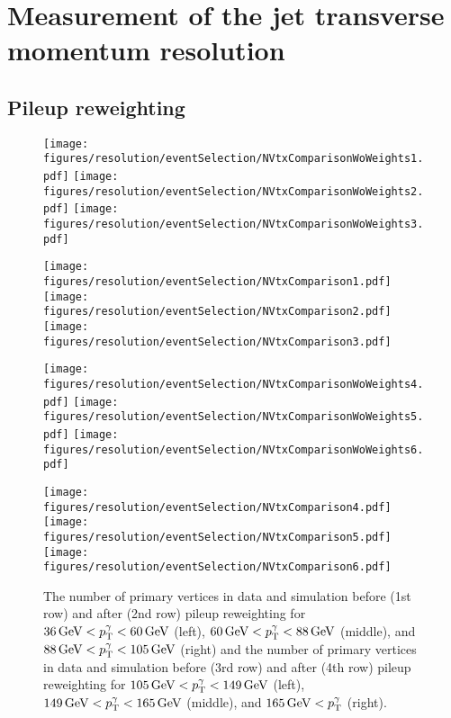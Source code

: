 \chapter{Measurement of the jet transverse momentum resolution}
\section{Pileup reweighting}
\label{res:app:pileup}

\begin{figure}[ht]
 \centering
    \texttt{[image: figures/resolution/eventSelection/NVtxComparisonWoWeights1.pdf]}
    \texttt{[image: figures/resolution/eventSelection/NVtxComparisonWoWeights2.pdf]}
    \texttt{[image: figures/resolution/eventSelection/NVtxComparisonWoWeights3.pdf]}

    \texttt{[image: figures/resolution/eventSelection/NVtxComparison1.pdf]}
    \texttt{[image: figures/resolution/eventSelection/NVtxComparison2.pdf]}
    \texttt{[image: figures/resolution/eventSelection/NVtxComparison3.pdf]}

    \texttt{[image: figures/resolution/eventSelection/NVtxComparisonWoWeights4.pdf]}
    \texttt{[image: figures/resolution/eventSelection/NVtxComparisonWoWeights5.pdf]}
    \texttt{[image: figures/resolution/eventSelection/NVtxComparisonWoWeights6.pdf]}

    \texttt{[image: figures/resolution/eventSelection/NVtxComparison4.pdf]}
    \texttt{[image: figures/resolution/eventSelection/NVtxComparison5.pdf]}
    \texttt{[image: figures/resolution/eventSelection/NVtxComparison6.pdf]}
   \caption{The number of primary vertices in data and simulation before (1st row) and after (2nd row) pileup reweighting for $36\,\text{Ge}\kern-0.06667em\text{V} < p_{\text{T}}^{\gamma} < 60\,\text{Ge}\kern-0.06667em\text{V}$ (left), $60\,\text{Ge}\kern-0.06667em\text{V} < p_{\text{T}}^{\gamma} < 88\,\text{Ge}\kern-0.06667em\text{V}$ (middle), 
            and $88\,\text{Ge}\kern-0.06667em\text{V} < p_{\text{T}}^{\gamma} < 105\,\text{Ge}\kern-0.06667em\text{V}$ (right) and the number of primary vertices in data and simulation before (3rd row) and after (4th row) pileup reweighting for $105\,\text{Ge}\kern-0.06667em\text{V} < p_{\text{T}}^{\gamma} < 149\,\text{Ge}\kern-0.06667em\text{V}$ (left), 
            $149\,\text{Ge}\kern-0.06667em\text{V} < p_{\text{T}}^{\gamma} < 165\,\text{Ge}\kern-0.06667em\text{V}$ (middle), and $165\,\text{Ge}\kern-0.06667em\text{V} < p_{\text{T}}^{\gamma}$ (right).}
  \label{res:fig:PUreweighting}
\end{figure}

